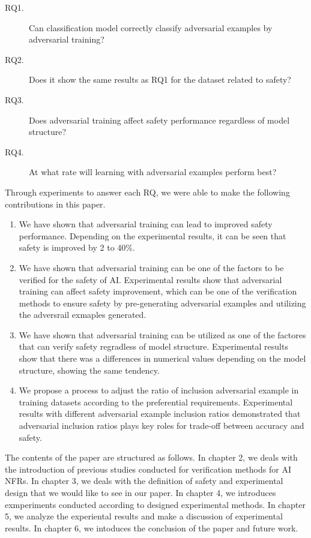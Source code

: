 \documentclass[journal,article,submit,moreauthors,pdftex]{Definitions/mdpi}
\begin{document}
\begin{description}
    \item[RQ1.]	Can classification model correctly classify adversarial examples by adversarial training?
    \item[RQ2.]	Does it show the same results as RQ1 for the dataset related to safety?
    \item[RQ3.] Does adversarial training affect safety performance regardless of model structure?
    \item[RQ4.]	At what rate will learning with adversarial examples perform best?
\end{description}

Through experiments to answer each RQ, we were able to make the following contributions in this paper.

\begin{enumerate}
    \item	We have shown that adversarial training can lead to improved safety performance. Depending on the experimental results, it can be seen that safety is improved by 2 to 40\%.
    \item	We have shown that adversarial training can be one of the factors to be verified for the safety of AI. Experimental results show that adversarial training can affect safety improvement, which can be one of the verification methods to ensure safety by pre-generating adversarial examples and utilizing the adversrail exmaples generated.
    \item   We have shown that adversarial training can be utilized as one of the factores that can verify safety regradless of model structure. Experimental results show that there was a differences in numerical values depending on the model structure, showing the same tendency.
    \item	We propose a process to adjust the ratio of inclusion adversarial example in training datasets according to the preferential requirements. Experimental results with different adversarial example inclusion ratios demonstrated that adversarial inclusion ratios plays key roles for trade-off between accuracy and safety.
\end{enumerate} 

The contents of the paper are structured as follows. In chapter 2, we deals with the introduction of previous studies conducted for verification methods for AI NFRs.
In chapter 3, we deals with the definition of safety and experimental design that we would like to see in our paper.
In chapter 4, we introduces exmperiments conducted according to designed experimental methods.
In chapter 5, we analyze the experiental results and make a discussion of experimental results.
In chapter 6, we intoduces the conclusion of the paper and future work.
\end{document}
